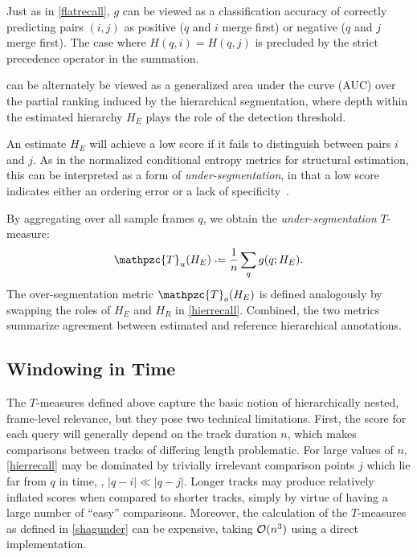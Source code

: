 \documentclass{article}
\def\shag{\ensuremath{\mathpzc{T}}}
\begin{document}
Just as in \cref{flatrecall}, $g$ can be viewed as a classification accuracy of correctly predicting pairs $(i, j)$ as positive ($q$ and $i$ merge first) or negative ($q$ and $j$ merge first).
The case where $H(q, i) = H(q, j)$ is precluded by the strict precedence operator in the summation.

 can be alternately be viewed as a generalized area under the curve (AUC) over the partial
ranking induced by the hierarchical segmentation, where depth within the estimated hierarchy $H_E$ plays the
role of the detection threshold.

An estimate $H_E$ will achieve a low score if it fails to distinguish between pairs $i$ and $j$.
As in the normalized conditional entropy metrics for structural estimation, this can be interpreted as a form of \emph{under-segmentation}, in that a low score indicates either an ordering error or a lack of specificity~\cite{Lukashevich2008}.  

By aggregating over all sample frames $q$, we obtain the \emph{under-segmentation} $T$-measure:
\begin{equation}
\shag_u(H_E) \defeq \frac{1}{n} \sum_q g(q ; H_E).\label{shagunder}
\end{equation}
The over-segmentation metric $\shag_o(H_E)$ is defined analogously by swapping the roles of $H_E$ and $H_R$ in \cref{hierrecall}.
Combined, the two metrics summarize agreement between estimated and reference hierarchical annotations.


\subsection{Windowing in Time}
\label{sec:window}

The $T$-measures defined above capture the basic notion of hierarchically nested, frame-level relevance, but they pose two technical limitations.
First, the score for each query will generally depend on the track duration $n$, which makes comparisons between tracks of differing length problematic.  
For large values of $n$, \cref{hierrecall} may be dominated by trivially irrelevant comparison points $j$ which lie far from $q$ in time, \ie, $|q-i| \ll |q-j|$.
Longer tracks may produce relatively inflated scores when compared to shorter tracks, simply by virtue of having a large number of ``easy'' comparisons.
Moreover, the calculation of the $T$-measures as defined in \cref{shagunder} can be expensive, taking $\mathcal{O}(n^3)$ using a direct implementation.
\end{document}
